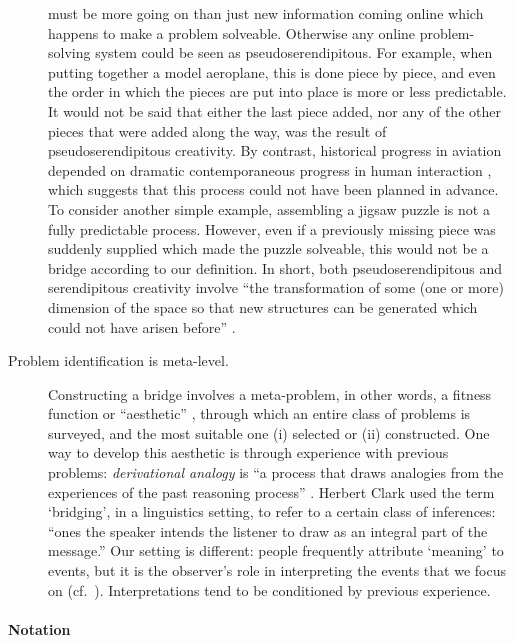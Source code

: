 \begin{description}
  must be more going on than just new information coming online which
  happens to make a problem solveable.  Otherwise any online
  problem-solving system could be seen as pseudoserendipitous.  For
  example, when putting together a model aeroplane, this is done piece
  by piece, and even the order in which the pieces are put into place
  is more or less predictable.  It would not be said that either the
  last piece added, nor any of the other pieces that were added along
  the way, was the result of pseudoserendipitous creativity.  By
  contrast, historical progress in aviation depended on dramatic
  contemporaneous progress in human interaction
  \cite[p.~292]{spenser2008airplane}, which suggests that this process
  could not have been planned in advance.  To consider another simple
  example, assembling a jigsaw puzzle is not a fully predictable
  process.  However, even if a previously missing piece was suddenly
  supplied which made the puzzle solveable, this would not be a bridge
  according to our definition.  In short, both pseudoserendipitous and
  serendipitous creativity involve ``the transformation of some (one
  or more) dimension of the space so that new structures can be
  generated which could not have arisen before''
  \cite[p.~348]{boden1998creativity}.
\item[Problem identification is meta-level.]  Constructing a bridge
  involves a meta-problem, in other words, a fitness function or
  ``aesthetic'' \cite{pease2011computational}, through which an entire
  class of problems is surveyed, and the most suitable one (i)
  selected or (ii) constructed.  One way to develop this aesthetic is
  through experience with previous problems: \emph{derivational
    analogy} is ``a process that draws analogies from the experiences
  of the past reasoning process'' \cite{Melis98anargument}. Herbert
  Clark \cite[p.~169]{Clark:1975:BRI:980190.980237} used the term
  `bridging', in a linguistics setting, to refer to a certain class of
  inferences: ``ones the speaker intends the listener to draw as an
  integral part of the message.''  Our setting is different: people
  frequently attribute `meaning' to events, but it is the observer's
  role in interpreting the events that we focus on
  (cf.~\cite{dennett_2013}).  Interpretations tend to be conditioned
  by previous experience.
\end{description}

\paragraph{\textbf{\upshape Notation}}

